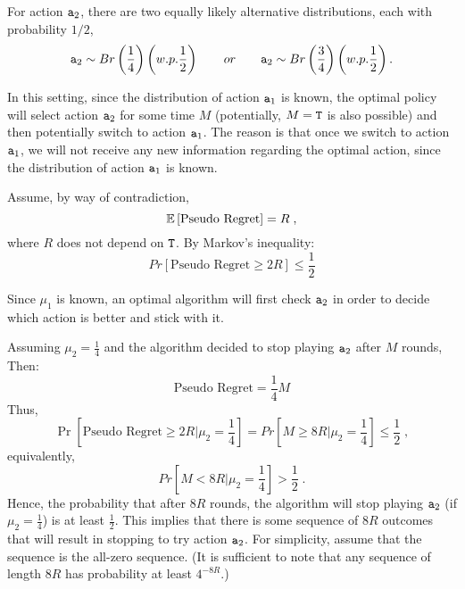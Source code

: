 For action ${\tt a}_2$, there are two equally likely  alternative distributions, each with probability $1/2$,
\[
{\tt a}_{2}\sim Br\left(\frac{1}{4}\right) \left(w.p. \frac{1}{2}\right)
\qquad or \qquad {\tt a}_{2}\sim Br\left(\frac{3}{4}\right) \left(w.p.
\frac{1}{2}\right).
\]

In this setting, since the distribution of action ${\tt a}_1$ is known, the optimal policy will select action ${\tt a}_2$ for some time $M$ (potentially, $M={\tt T}$ is also possible) and then potentially switch to action ${\tt a}_1$. The reason is that once we switch to action ${\tt a}_1$, we will not receive any new information regarding the optimal action, since the distribution of action ${\tt a}_1$ is known. 

Assume, by way of contradiction,
\[
\mathbb{E}\left[\text{Pseudo Regret}\right]=R\;,
\]
where $R$ does not depend on ${\tt T}$. By Markov's inequality:
\[
Pr\left[\text{Pseudo Regret}\ge2R\right]\le\frac{1}{2}
\]

Since $\mu_1$ is known, an optimal algorithm will first check ${\tt a}_2$
in order to decide which action is better and stick with it.

Assuming $\mu_2 = \frac{1}{4}$ and the algorithm decided to stop
playing ${\tt a}_2$ after $M$ rounds, Then:
\[
\text{Pseudo Regret} = \frac{1}{4}M
\]
Thus,
\[
\Pr\left[\text{Pseudo Regret}\ge 2R |\mu_2 =\frac{1}{4}\right] = Pr\left[ M\ge 8R |\mu_2 =\frac{1}{4} \right]\le\frac{1}{2} \;,
\]
equivalently,
\[
Pr\left[M < 8R | \mu_2 =\frac{1}{4}\right]>\frac{1}{2}\;.
\]
Hence, the probability that after $8R$ rounds, the algorithm will
stop playing ${\tt a}_2$ (if $\mu_2 = \frac{1}{4}$) is at least
$\frac{1}{2}$. This implies that there is some sequence of $8R$
outcomes that will result in stopping to try action ${\tt a}_2$. For simplicity, assume that the sequence is the all-zero sequence. (It is sufficient to note that any sequence of length $8R$ has probability at least $4^{-8R}$.)


